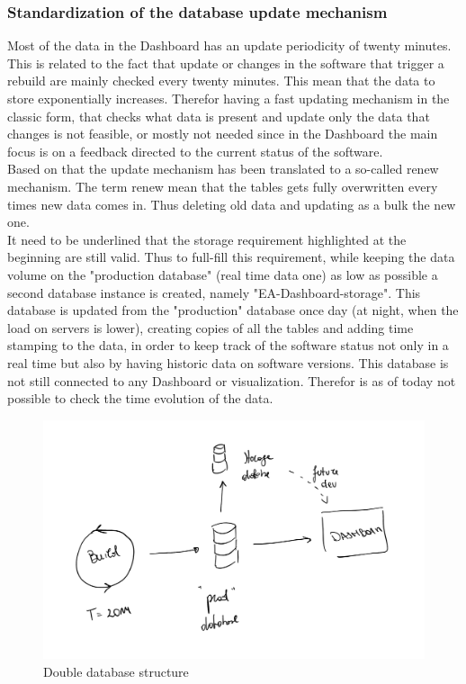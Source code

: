 \documentclass[../main.tex]{subfiles}
\begin{document}
\subsubsection{Standardization of the database update mechanism}
Most of the data in the Dashboard has an update periodicity of twenty minutes. This is related to the fact that update or changes in the software that trigger a rebuild are mainly checked every twenty minutes. This mean that the data to store exponentially increases. Therefor having a fast updating mechanism in the classic form, that checks what data is present and update only the data that changes is not feasible, or mostly not needed since in the Dashboard the main focus is on a feedback directed to the current status of the software.\\
Based on that the update mechanism has been translated to a so-called renew mechanism. The term renew mean that the tables gets fully overwritten every times new data comes in. Thus deleting old data and updating as a bulk the new one.\\
It need to be underlined that the storage requirement highlighted at the beginning are still valid. Thus to full-fill this requirement, while keeping the data volume on the "production database" (real time data one) as low as possible a second database instance is created, namely "EA-Dashboard-storage". This database is updated from the "production" database once day (at night, when the load on servers is lower), creating copies of all the tables and adding time stamping to the data, in order to keep track of the software status not only in a real time  but also by having historic data on software versions. This database is not still connected to any Dashboard or visualization. Therefor is as of today not possible to check the time evolution of the data. 
\begin{figure}
    \centering
    \includegraphics[width=\linewidth]{images_folder/dual_db.png}
    \caption{Double database structure}
    \label{fig:dds}
\end{figure}
\end{document}
